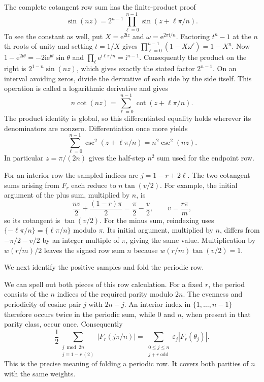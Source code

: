 The complete cotangent row sum has the finite-product proof
\[
 \sin(nz)=2^{n-1}\prod_{\ell=0}^{n-1}\sin(z+\ell\pi/n).
\]
To see the constant as well, put $X=\mathrm e^{2\mathrm iz}$ and
$\omega=\mathrm e^{2\pi\mathrm i/n}$. Factoring $t^n-1$ at the
$n$th roots of unity and setting $t=1/X$ gives
$\prod_{\ell=0}^{n-1}(1-X\omega^\ell)=1-X^n$.
Now $1-\mathrm e^{2\mathrm i\theta}=-2\mathrm i\mathrm e^{\mathrm i\theta}\sin\theta$
and $\prod_\ell\mathrm e^{\mathrm i\ell\pi/n}=\mathrm i^{n-1}$.
Consequently the product on the right is $2^{1-n}\sin(nz)$,
which gives exactly the stated factor $2^{n-1}$.
On an interval avoiding zeros, divide the derivative of each
side by the side itself. This operation is called a logarithmic
derivative and gives
\[
 n\cot(nz)=\sum_{\ell=0}^{n-1}\cot(z+\ell\pi/n).
\]
The product identity is global, so this differentiated equality holds
wherever its denominators are nonzero. Differentiation once more yields
\[
 \sum_{\ell=0}^{n-1}\csc^2(z+\ell\pi/n)
                    =n^2\csc^2(nz).
\]
In particular $z=\pi/(2n)$ gives the half-step $n^2$ sum used
for the endpoint row.

For an interior row the sampled indices are $j=1-r+2\ell$.
The two cotangent sums arising from $F_r$ each reduce to
$n\tan(v/2)$. For example, the initial argument of the plus
sum, multiplied by $n$, is
\[
 \frac{nv}{2}+\frac{(1-r)\pi}{2}
      =\frac\pi2-\frac v2,
 \qquad v=\frac{r\pi}{m},
\]
so its cotangent is $\tan(v/2)$. For the minus sum, reindexing uses
$\{-\ell\pi/n\}=\{\ell\pi/n\}$ modulo $\pi$. Its
initial argument, multiplied by $n$, differs from $-\pi/2-v/2$ by an
integer multiple of $\pi$, giving the same value. Multiplication
by $w(r/m)/2$ leaves the signed row sum $n$ because
$w(r/m)\tan(v/2)=1$.

We next identify the positive samples and fold the periodic row.

We can spell out both pieces of this row calculation. For a fixed
$r$, the period consists of the $n$ indices of the required parity
modulo $2n$. The evenness and periodicity of cosine pair $j$ with
$2n-j$. An interior index in $\{1,\ldots,n-1\}$ therefore occurs
twice in the periodic sum, while $0$ and $n$, when present in that
parity class, occur once. Consequently
\[
 \frac12\sum_{\substack{j\bmod 2n\\j\equiv1-r\ (2)}}
        |F_r(j\pi/n)|
 =\sum_{\substack{0\leq j\leq n\\j+r\text{ odd}}}
        \varepsilon_j|F_r(\theta_j)|.
\]
This is the precise meaning of folding a periodic row. It covers
both parities of $n$ with the same weights.


